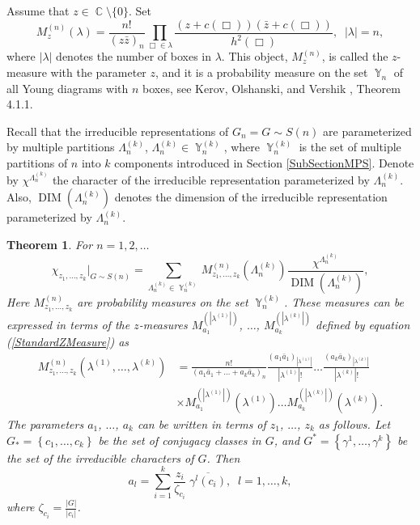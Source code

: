 \documentclass[12pt]{amsart}
\newtheorem{thm}{Theorem}[section]
\theoremstyle{definition}
\numberwithin{equation}{section}
\DeclareMathOperator{\Y}{\mathbb{Y}}
\DeclareMathOperator{\C}{\mathbb{C}}
\DeclareMathOperator{\DIM}{DIM}
\begin{document}
Assume that $z\in\C\setminus\{0\}$. Set
\begin{equation}\label{StandardZMeasure}
M_z^{(n)}\left(\lambda\right)=\frac{n!}{\left(z\bar{z}\right)_n}\prod\limits_{\Box\in\lambda}
\frac{(z+c(\Box))(\bar{z}+c(\Box))}{h^2(\Box)},\;\; |\lambda|=n,
\end{equation}
where $|\lambda|$ denotes the number of boxes in $\lambda$.
This object, $M_z^{(n)}$, is called the $z$-measure with the parameter $z$, and it is a probability measure on the set $\Y_n$ of all Young diagrams with $n$ boxes, see Kerov, Olshanski, and Vershik \cite{KerovOlshanskiVershik}, Theorem 4.1.1.

Recall that the irreducible representations of $G_n=G\sim S(n)$
are parameterized by multiple partitions $\Lambda_n^{(k)}$,
$\Lambda_n^{(k)}\in\Y_n^{(k)}$, where
$\Y_n^{(k)}$ is the set of multiple partitions of $n$ into $k$ components introduced in Section \ref{SubSectionMPS}.
Denote by $\chi^{\Lambda_n^{(k)}}$ the character of the irreducible representation parameterized by $\Lambda_n^{(k)}$.
Also, $\DIM\left(\Lambda_n^{(k)}\right)$ denotes the dimension of the irreducible representation parameterized by $\Lambda_n^{(k)}$.
\begin{thm}\label{TheoremMultpleZmeasures} For $n=1,2,\ldots$
\begin{equation}\label{SPHERICALFUNCTIONZMEASURES}
\chi_{z_1,\ldots,z_k}\biggl|_{G\sim S(n)}
=\underset{\Lambda_n^{(k)}\in\Y_n^{(k)}}{\sum}
M_{z_1,\ldots,z_k}^{(n)}\left(\Lambda_n^{(k)}\right)
\frac{\chi^{\Lambda_n^{(k)}}}{\DIM\left(\Lambda_n^{(k)}\right)},
\end{equation}
Here $M_{z_1,\ldots,z_k}^{(n)}$ are probability measures on the set
$\Y_n^{(k)}$.
These measures can be expressed in terms of the $z$-measures $M_{a_1}^{(|\lambda^{(1)}|)}$, $\ldots$,
$M_{a_k}^{(|\lambda^{(k)}|)}$ defined by equation (\ref{StandardZMeasure}) as
\begin{equation}\label{MultipleZmeasures}
\begin{split}
M_{z_1,\ldots,z_k}^{(n)}\left(\lambda^{(1)},\ldots,\lambda^{(k)}\right)
&=
\frac{n!}{\left(a_1\bar{a}_1+\ldots+a_k\bar{a}_k\right)_n}
\frac{(a_1\bar{a}_1)_{|\lambda^{(1)}|}}{|\lambda^{(1)}|!}
\ldots
\frac{(a_k\bar{a}_k)_{|\lambda^{(k)}|}}{|\lambda^{(k)}|!}\\
&\times M_{a_1}^{(|\lambda^{(1)}|)}\left(\lambda^{(1)}\right)\ldots
M_{a_k}^{(|\lambda^{(k)}|)}\left(\lambda^{(k)}\right).
\end{split}
\end{equation}
The parameters $a_1$, $\ldots$, $a_k$ can be written in terms of $z_1$, $\ldots$, $z_k$ as follows. Let $G_{\ast}=\left\{c_1,\ldots,c_k\right\}$ be the set of conjugacy classes in $G$,
and $G^{\ast}=\left\{\gamma^1,\ldots,\gamma^k\right\}$ be the set of the irreducible characters of $G$.
 Then
\begin{equation}\label{Parametersa}
a_l=\sum\limits_{i=1}^k\frac{z_i}{\zeta_{c_i}}\;\overline{\gamma^l(c_i)},\;\; l=1,\ldots,k,
\end{equation}
where $\zeta_{c_i}=\frac{|G|}{|c_i|}$.
\end{thm}
\end{document}
